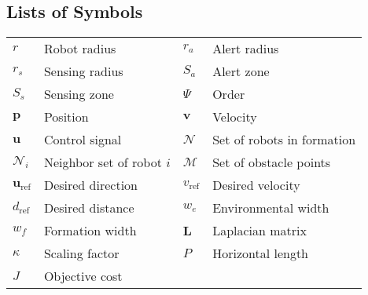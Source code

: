 \subsection*{Lists of Symbols}
\vspace{-0.5cm}
\begin{table*}[h]
\begin{tabular}{p{2cm}p{5cm}|p{2cm}p{5cm}}
$r$             & Robot radius &
$r_a$           & Alert radius \\
$r_s$           & Sensing radius &
$S_a$           & Alert zone \\
$S_s$           & Sensing zone &
$\Psi$          & Order \\
$\mathbf{p}$    & Position &
$\mathbf{v}$    & Velocity \\
$\mathbf{u}$    & Control signal &
$\mathcal{N}$   & Set of robots in formation \\
$\mathcal{N}_i$ & Neighbor set of robot $i$ &
$\mathcal{M}$   & Set of obstacle points \\
$\mathbf{u}_\text{ref}$ & Desired direction &
$v_\text{ref}$  & Desired velocity \\
$d_\text{ref}$  & Desired distance &
$w_e$           & Environmental width \\
$w_f$           & Formation width &
$\mathbf{L}$    & Laplacian matrix \\
$\kappa$        & Scaling factor &
$P$             & Horizontal length \\
$J$             & Objective cost & & \\
\end{tabular}
\end{table*}
